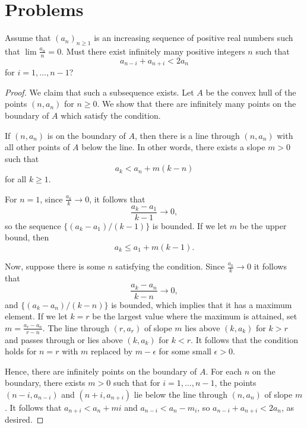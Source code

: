 \documentclass[11pt]{scrartcl}
\begin{document}
\section{Problems}
\begin{prob}[Putnam 2001 B6] Assume that $(a_n)_{n \ge 1}$ is an increasing sequence of positive real numbers such that $\lim \frac{a_n}{n} = 0$.  Must there exist infinitely many positive integers $n$ such that 
$$a_{n-i} + a_{n+i} < 2a_n$$
for $i = 1, \dots, n-1$?
\end{prob}
\begin{proof}
We claim that such a subsequence exists.  Let $A$ be the convex hull of the points $(n, a_n)$ for $n \ge 0$.  We show that there are infinitely many points on the boundary of $A$ which satisfy the condition.  

If $(n, a_n)$ is on the boundary of $A$, then there is a line through $(n, a_n)$ with all other points of $A$ below the line.  In other words, there exists a slope $m > 0$ such that $$a_k < a_n + m(k-n)$$
for all $k \ge 1$.  

For $n = 1$, since $\frac{a_k}{k} \to 0$, it follows that $$\frac{a_k-a_1}{k-1} \to 0,$$
so the sequence $\{(a_k - a_1)/(k-1)\}$ is bounded.  If we let $m$ be the upper bound, then $$a_k \le a_1 + m(k-1).$$

Now, suppose there is some $n$ satisfying the condition.  Since $\frac{a_k}{k} \to 0$ it follows that 
$$\frac{a_k-a_n}{k-n} \to 0,$$
and $\{(a_k - a_n)/(k-n)\}$ is bounded, which implies that it has a maximum element.  If we let $k = r$ be the largest value where the maximum is attained, set $m = \frac{a_r - a_n}{r-n}$.  The line through $(r, a_r)$ of slope $m$ lies above $(k, a_k)$ for $k > r$ and passes through or lies above $(k, a_k)$ for $k < r$.  It follows that the condition holds for $n = r$ with $m$ replaced by $m - \epsilon$ for some small $\epsilon>0$.

Hence, there are infinitely points on the boundary of $A$.  For each $n$ on the boundary, there exists $m > 0$ such that for $i = 1, \dots, n-1$, the points $(n-i, a_{n-i})$ and $(n+i, a_{n+i})$ lie below the line through $(n, a_n)$ of slope $m$.  It follows that $a_{n+i} < a_n + mi$ and $a_{n-i} < a_n - m_i$, so $a_{n-i} + a_{n+i} < 2a_n$, as desired.
 \end{proof}
 
 
\end{document}
